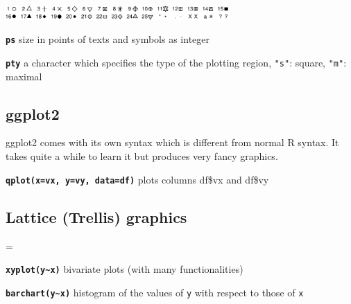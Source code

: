 \documentclass[8pt,landscape]{article}
\newcommand{\code}{\texttt}
\newcommand{\bcode}[1]{\texttt{\textbf{#1}}}
\begin{document}
\begin{multicols*}{3}
\samepage\includegraphics[width=8.5cm]{pch_symbol} 

\smallskip

\bcode{ps}   size in points of texts and symbols as integer

\bcode{pty}  a character which specifies the type of the plotting region, \code{"s"}: square, \code{"m"}: maximal






\bigskip

\subsection{ggplot2}

ggplot2 comes with its own syntax which is different from normal R syntax. It takes quite a while to learn it but produces very fancy graphics.

\bcode{qplot(x=vx, y=vy, data=df)} plots columns df\$vx and df\$vy
% 
% 

\bigskip

\subsection{Lattice (Trellis) graphics}
\everypar={\hangindent=9mm}

\bcode{xyplot(y\~{}x)}  bivariate plots (with many functionalities)

\bcode{barchart(y\~{}x)}  histogram of the values of \code{y} with
respect to those of \code{x}


\end{multicols*}
\end{document}
